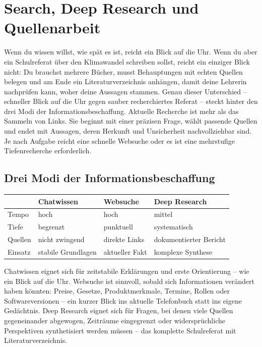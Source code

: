 \chapter{Search, Deep Research und Quellenarbeit}

Wenn du wissen willst, wie spät es ist, reicht ein Blick auf die Uhr. Wenn du aber ein Schulreferat über den Klimawandel schreiben sollst, reicht ein einziger Blick nicht: Du brauchst mehrere Bücher, musst Behauptungen mit echten Quellen belegen und am Ende ein Literaturverzeichnis anhängen, damit deine Lehrerin nachprüfen kann, woher deine Aussagen stammen. Genau dieser Unterschied -- schneller Blick auf die Uhr gegen sauber recherchiertes Referat -- steckt hinter den drei Modi der Informationsbeschaffung. Aktuelle Recherche ist mehr als das Sammeln von Links. Sie beginnt mit einer präzisen Frage, wählt passende Quellen und endet mit Aussagen, deren Herkunft und Unsicherheit nachvollziehbar sind. Je nach Aufgabe reicht eine schnelle Websuche oder es ist eine mehrstufige Tiefenrecherche erforderlich.

\section{Drei Modi der Informationsbeschaffung}

\begin{tabularx}{\textwidth}{@{}lXXX@{}}\toprule
&\textbf{Chatwissen}&\textbf{Websuche}&\textbf{Deep Research}\\\midrule
Tempo&hoch&hoch&mittel\\
Tiefe&begrenzt&punktuell&systematisch\\
Quellen&nicht zwingend&direkte Links&dokumentierter Bericht\\
Einsatz&stabile Grundlagen&aktueller Fakt&komplexe Synthese\\\bottomrule
\end{tabularx}

Chatwissen eignet sich für zeitstabile Erklärungen und erste Orientierung -- wie ein Blick auf die Uhr. Websuche ist sinnvoll, sobald sich Informationen verändert haben könnten: Preise, Gesetze, Produktmerkmale, Termine, Rollen oder Softwareversionen -- ein kurzer Blick ins aktuelle Telefonbuch statt ins eigene Gedächtnis. Deep Research eignet sich für Fragen, bei denen viele Quellen gegeneinander abgewogen, Zeiträume eingegrenzt oder widersprüchliche Perspektiven synthetisiert werden müssen -- das komplette Schulreferat mit Literaturverzeichnis.


